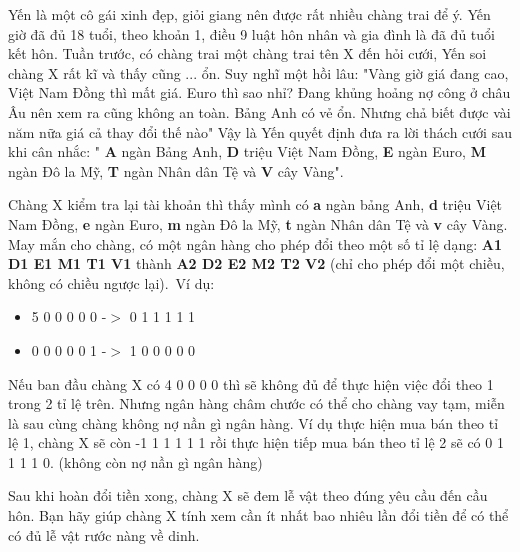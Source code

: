 Yến là một cô gái xinh đẹp, giỏi giang nên được rất nhiều chàng trai để ý. Yến giờ đã đủ 18 tuổi, theo khoản 1, điều 9 luật hôn nhân và gia đình là đã đủ tuổi kết hôn. Tuần trước, có chàng trai một chàng trai tên X đến hỏi cưới, Yến soi chàng X rất kĩ và thấy cũng ... ổn. Suy nghĩ một hồi lâu: "Vàng giờ giá đang cao, Việt Nam Đồng thì mất giá. Euro thì sao nhỉ? Đang khủng hoảng nợ công ở châu Âu nên xem ra cũng không an toàn. Bảng Anh có vẻ ổn. Nhưng chả biết được vài năm nữa giá cả thay đổi thế nào" Vậy là Yến quyết định đưa ra lời thách cưới sau khi cân nhắc: " \textbf{ A } ngàn Bảng Anh, \textbf{ D } triệu Việt Nam Đồng, \textbf{ E } ngàn Euro, \textbf{ M } ngàn Đô la Mỹ, \textbf{ T } ngàn Nhân dân Tệ và \textbf{ V } cây Vàng".

Chàng X kiểm tra lại tài khoản thì thấy mình có \textbf{ a } ngàn bảng Anh, \textbf{ d } triệu Việt Nam Đồng, \textbf{ e } ngàn Euro, \textbf{ m } ngàn Đô la Mỹ, \textbf{ t } ngàn Nhân dân Tệ và \textbf{ v } cây Vàng. May mắn cho chàng, có một ngân hàng cho phép đổi theo một số tỉ lệ dạng: \textbf{ A1 D1 E1 M1 T1 V1 } thành \textbf{ A2 D2 E2 M2 T2 V2 } (chỉ cho phép đổi một chiều, không có chiều ngược lại). Ví dụ:
\begin{itemize}
	\item 5 0 0 0 0 0 -$>$ 0 1 1 1 1 1
	\item 0 0 0 0 0 1 -$>$ 1 0 0 0 0 0
\end{itemize}

Nếu ban đầu chàng X có 4 0 0 0 0 thì sẽ không đủ để thực hiện việc đổi theo 1 trong 2 tỉ lệ trên. Nhưng ngân hàng châm chước có thể cho chàng vay tạm, miễn là sau cùng chàng không nợ nần gì ngân hàng. Ví dụ thực hiện mua bán theo tỉ lệ 1, chàng X sẽ còn -1 1 1 1 1 1 rồi thực hiện tiếp mua bán theo tỉ lệ 2 sẽ có 0 1 1 1 1 0. (không còn nợ nần gì ngân hàng)

Sau khi hoàn đổi tiền xong, chàng X sẽ đem lễ vật theo đúng yêu cầu đến cầu hôn. Bạn hãy giúp chàng X tính xem cần ít nhất bao nhiêu lần đổi tiền để có thể có đủ lễ vật rước nàng về dinh.